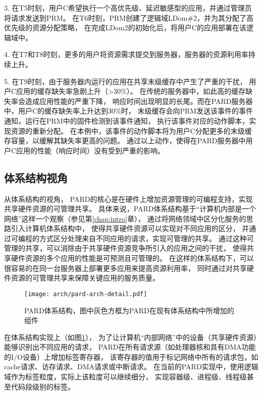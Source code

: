 3. 在T5时刻，用户C希望执行一个高优先级、延迟敏感型的应用，并通过管理员将请求发送到PRM。
在T6时刻，PRM创建了逻辑域LDom\#2，并为其分配了高优先级的资源分配策略，
在完成LDom2的初始化后，将用户C的应用部署在该逻辑域中。

4. 在T7和T8时刻，更多的用户将资源需求提交到服务器，服务器的资源利用率持续上升。

5. 在T9时刻，由于服务器内运行的应用在共享末级缓存中产生了严重的干扰，
用户C应用的缓存缺失率急剧上升（>30\%）。
在传统的服务器中，如此高的缓存缺失率会造成应用性能的严重下降，
响应时间出现明显的长尾。而在PARD服务器中，用户C的缓存缺失率上升达到30\%时，
末级缓存会向PRM发送该事件的事件通知，运行在PRM中的固件检测到该事件通知，
执行该事件对应的动作脚本，实现资源的重新分配。
在本例中，该事件的动作脚本将为用户C分配更多的末级缓存容量，以缓解其缺失率更高的问题。
通过以上动作，使得在PARD服务器中用户C应用的性能（响应时间）没有受到严重的影响。


\subsection{体系结构视角}

从体系结构的视角，
PARD的核心是在硬件上增加资源管理的可编程支持，实现共享硬件资源的可管理共享。
具体来说，PARD体系结构基于``计算机内部是一个网络''这样一个观察（参见第\ref{chap:intro}章），
通过将网络领域中区分化服务的思路引入计算机体系结构中，
使得共享硬件资源可以实现对不同应用的区分，
并通过可编程的方式区分处理来自不同应用的请求，实现可管理的共享。
通过这种可管理的共享，可以消除由于共享硬件资源竞争所引入的应用之间的干扰，
使得共享硬件资源的多个应用的性能是可预测且可管理的。
在这样的体系结构下，可以很容易的在同一台服务器上部署更多应用来提高资源利用率，
同时通过对共享硬件资源的可管理共享来保障关键应用的服务质量。

\begin{figure}[b]
  \centering
  \texttt{[image: arch/pard-arch-detail.pdf]}
  \caption[PARD体系结构]{PARD体系结构，图中灰色方框为PARD在现有体系结构中所增加的组件}
  \label{fig:pard-arch-detail}
\end{figure}

在体系结构实现上（如图\ref{fig:pard-arch-detail}），
为了让计算机``内部网络''中的设备（共享硬件资源）能够识别出不同应用的请求，
PARD在所有请求源（如处理器核和具有DMA功能的I/O设备）上增加标签寄存器，
该寄存器的值用于标记网络中所有的请求包，如cache请求、访存请求、DMA请求或中断请求。
在当前的PARD实现中，使用逻辑域作为标签粒度，实际上该粒度可以继续细分，
实现容器级、进程级、线程级甚至代码段级别的标签。

